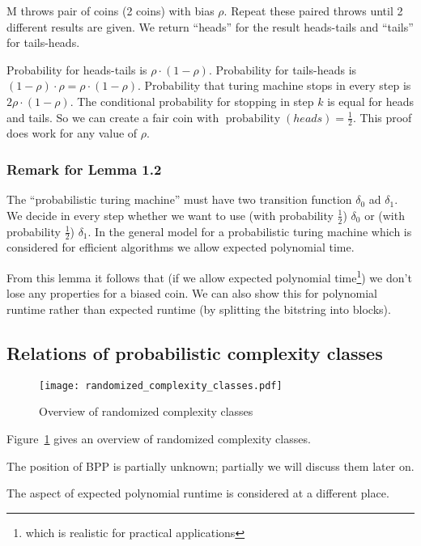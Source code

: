 \documentclass[a4paper]{article}
\newcommand{\cls}[1]{\rm{#1}}
\DeclareMathOperator{\prop}{probability}
\begin{document}
M throws pair of coins (2 coins) with bias $\rho$. Repeat these paired throws
until 2 different results are given. We return ``heads'' for the result
heads-tails and ``tails'' for tails-heads.

Probability for heads-tails is $\rho \cdot (1-\rho)$.
Probability for tails-heads is $(1-\rho) \cdot \rho = \rho \cdot (1 - \rho)$.
Probability that turing machine stops in every step is $2\rho \cdot (1-\rho)$.
The conditional probability for stopping in step $k$ is equal for heads
and tails. So we can create a fair coin with $\prop(heads) = \frac12$.
This proof does work for any value of $\rho$.

\subsubsection{Remark for Lemma 1.2}
%
The ``probabilistic turing machine'' must have two transition function
$\delta_0$ ad $\delta_1$. We decide in every step whether we want to use
(with probability $\frac12$) $\delta_0$ or (with probability $\frac12$)
$\delta_1$. In the general model for a probabilistic turing machine
which is considered for efficient algorithms we allow expected polynomial
time.

From this lemma it follows that (if we allow expected polynomial
time\footnote{which is realistic for practical applications})
we don't lose any properties for a biased coin.
We can also show this for polynomial runtime rather than expected runtime
(by splitting the bitstring into blocks).

\subsection{Relations of probabilistic complexity classes}
%
\begin{figure}[ht]
  \begin{center}
    \texttt{[image: randomized\_complexity\_classes.pdf]}
    \caption{Overview of randomized complexity classes}
    \label{fig:complexity-classes}
  \end{center}
\end{figure}

Figure~\ref{fig:complexity-classes} gives an overview of randomized complexity classes.

The position of \cls{BPP} is partially unknown; partially we will discuss them later on.

The aspect of expected polynomial runtime is considered at a different place.
\end{document}
